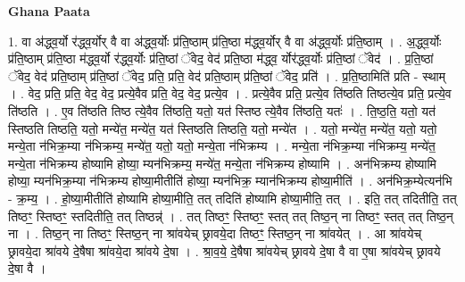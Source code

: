 \documentclass[17pt]{extarticle}
\begin{document}
\textbf{Ghana Paata } \newline

1. वा अ॑द्ध्व॒र्यो र॑द्ध्व॒र्योर् वै वा अ॑द्ध्व॒र्योः प्र॑ति॒ष्ठाम् प्र॑ति॒ष्ठा म॑द्ध्व॒र्योर् वै वा अ॑द्ध्व॒र्योः प्र॑ति॒ष्ठाम् । . अ॒द्ध्व॒र्योः प्र॑ति॒ष्ठाम् प्र॑ति॒ष्ठा म॑द्ध्व॒र्यो र॑द्ध्व॒र्योः प्र॑ति॒ष्ठां ॅवेद॒ वेद॑ प्रति॒ष्ठा म॑द्ध्व॒ र्योर॑द्ध्व॒र्योः प्र॑ति॒ष्ठां ॅवेद॑ । . प्र॒ति॒ष्ठां ॅवेद॒ वेद॑ प्रति॒ष्ठाम् प्र॑ति॒ष्ठां ॅवेद॒ प्रति॒ प्रति॒ वेद॑ प्रति॒ष्ठाम् प्र॑ति॒ष्ठां ॅवेद॒ प्रति॑ । . प्र॒ति॒ष्ठामिति॑ प्रति - स्थाम् । . वेद॒ प्रति॒ प्रति॒ वेद॒ वेद॒ प्रत्ये॒वैव प्रति॒ वेद॒ वेद॒ प्रत्ये॒व । . प्रत्ये॒वैव प्रति॒ प्रत्ये॒व ति॑ष्ठति तिष्ठत्ये॒व प्रति॒ प्रत्ये॒व ति॑ष्ठति । . ए॒व ति॑ष्ठति तिष्ठ त्ये॒वैव ति॑ष्ठति॒ यतो॒ यत॑ स्तिष्ठ त्ये॒वैव ति॑ष्ठति॒ यतः॑ । . ति॒ष्ठ॒ति॒ यतो॒ यत॑ स्तिष्ठति तिष्ठति॒ यतो॒ मन्ये॑त॒ मन्ये॑त॒ यत॑ स्तिष्ठति तिष्ठति॒ यतो॒ मन्ये॑त । . यतो॒ मन्ये॑त॒ मन्ये॑त॒ यतो॒ यतो॒ मन्ये॒ता न॑भिक्र॒म्या न॑भिक्रम्य॒ मन्ये॑त॒ यतो॒ यतो॒ मन्ये॒ता न॑भिक्रम्य । . मन्ये॒ता न॑भिक्र॒म्या न॑भिक्रम्य॒ मन्ये॑त॒ मन्ये॒ता न॑भिक्रम्य होष्यामि होष्या॒ म्यन॑भिक्रम्य॒ मन्ये॑त॒ मन्ये॒ता न॑भिक्रम्य होष्यामि । . अन॑भिक्रम्य होष्यामि होष्या॒ म्यन॑भिक्र॒म्या न॑भिक्रम्य होष्या॒मीतीति॑ होष्या॒ म्यन॑भिक्र॒ म्यान॑भिक्रम्य होष्या॒मीति॑ । . अन॑भिक्र॒म्येत्यन॑भि - क्र॒म्य॒ । . हो॒ष्या॒मीतीति॑ होष्यामि होष्या॒मीति॒ तत् तदिति॑ होष्यामि होष्या॒मीति॒ तत् । . इति॒ तत् तदितीति॒ तत् तिष्ठꣳ॒॒ स्तिष्ठꣳ॒॒ स्तदितीति॒ तत् तिष्ठन्न्॑ । . तत् तिष्ठꣳ॒॒ स्तिष्ठꣳ॒॒ स्तत् तत् तिष्ठ॒न् ना तिष्ठꣳ॒॒ स्तत् तत् तिष्ठ॒न् ना । . तिष्ठ॒न् ना तिष्ठꣳ॒॒ स्तिष्ठ॒न् ना श्रा॑वयेच् छ्रावये॒दा तिष्ठꣳ॒॒ स्तिष्ठ॒न् ना श्रा॑वयेत् । . आ श्रा॑वयेच् छ्रावये॒दा श्रा॑वये दे॒षैषा श्रा॑वये॒दा श्रा॑वये दे॒षा । . श्रा॒व॒ये॒ दे॒षैषा श्रा॑वयेच् छ्रावये दे॒षा वै वा ए॒षा श्रा॑वयेच् छ्रावये दे॒षा वै । \newline
\end{document}
